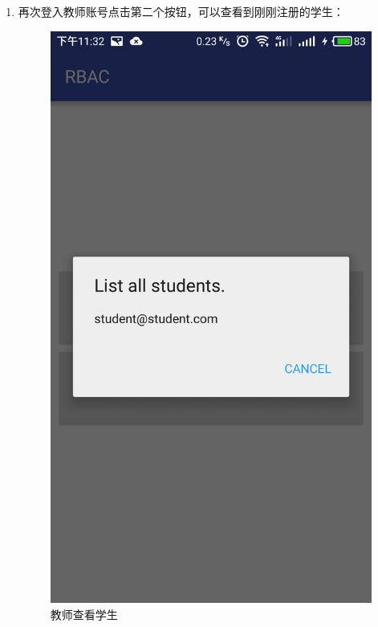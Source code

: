 \begin{itemize}
\begin{enumerate}
\begin{itemize}
\begin{enumerate}
				\item 再次登入教师账号点击第二个按钮，可以查看到刚刚注册的学生：
				\begin{figure}[H]
					\centering
					\includegraphics[height=0.35\textheight]{snapshot/12}
					\caption{教师查看学生}
					\label{fig:12}
				\end{figure}
			

\end{enumerate}
\end{itemize}
\end{enumerate}
\end{itemize}

